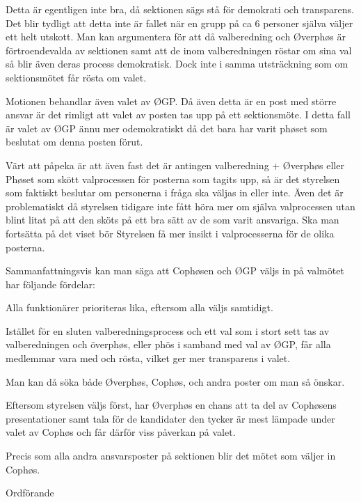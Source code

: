 \documentclass[../_main/handlingar.tex]{subfiles}
\begin{document}
\begin{enumerate}
    Detta är egentligen inte bra, då sektionen sägs stå för demokrati och transparens. Det blir tydligt att detta inte är fallet när en grupp på ca 6 personer själva väljer ett helt utskott. Man kan argumentera för att då valberedning och Øverphøs är förtroendevalda av sektionen samt att de inom valberedningen röstar om sina val så blir även deras process demokratisk. Dock inte i samma utsträckning som om sektionsmötet får rösta om valet.
\end{enumerate}

Motionen behandlar även valet av ØGP. Då även detta är en post med större ansvar är det rimligt att valet av posten tas upp på ett sektionsmöte. I detta fall är valet av ØGP ännu mer odemokratiskt då det bara har varit phøset som beslutat om denna posten förut.

Värt att påpeka är att även fast det är antingen valberedning + Øverphøs eller Phøset som skött valprocessen för posterna som tagits upp, så är det styrelsen som faktiskt beslutar om personerna i fråga ska väljas in eller inte. Även det är problematiskt då styrelsen tidigare inte fått höra mer om själva valprocessen utan blint litat på att den sköts på ett bra sätt av de som varit ansvariga. Ska man fortsätta på det viset bör Styrelsen få mer insikt i valprocesserna för de olika posterna.

Sammanfattningsvis kan man säga att Cophøsen och ØGP väljs in på valmötet har följande fördelar:
\begin{dashlist}
    \item Alla funktionärer prioriteras lika, eftersom alla väljs samtidigt.
    \item Istället för en sluten valberedningsprocess och ett val som i stort sett tas av valberedningen och överphøs, eller phös i samband med val av ØGP, får alla medlemmar vara med och rösta, vilket ger mer transparens i valet.
    \item Man kan då söka både Øverphøs, Cophøs, och andra poster om man så önskar.
    \item Eftersom styrelsen väljs först, har Øverphøs en chans att ta del av Cophøsens presentationer samt tala för de kandidater den tycker är mest lämpade under valet av Cophøs och får därför viss påverkan på valet.
    \item Precis som alla andra ansvarsposter på sektionen blir det mötet som väljer in Cophøs.
\end{dashlist}

\begin{signatures}{1}
	\ist
	\signature{Daniel Bakic}{Ordförande}
\end{signatures}
\end{document}
